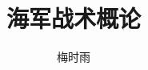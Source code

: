 \documentclass{seuthesis-2019}
\title{海军战术概论}{现代化海战}
\author{梅时雨}
\begin{document}
\maketitle
\makedeclaration
\end{document}
